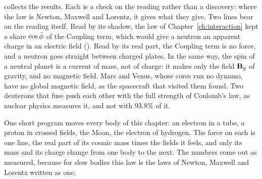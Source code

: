  collects the results. Each is a check on the reading rather than a discovery: where the law is Newton, Maxwell and Lorentz, it gives what they give. Two lines bear on the reading itself. Read by its shadow, the law of Chapter~\ref{ch:interaction} kept a share $\cos\bar{\phi}$ of the Coupling term, which would give a neutron an apparent charge in an electric field (). Read by its real part, the Coupling term is no force, and a neutron goes straight between charged plates. In the same way, the spin of a neutral planet is a current of mass, not of charge: it makes only the field $\mathbf{B}_g$ of gravity, and no magnetic field. Mars and Venus, whose cores run no dynamo, have no global magnetic field, as the spacecraft that visited them found. Two deuterons that fuse push each other with the full strength of Coulomb's law, as nuclear physics measures it, and not with $93.8\%$ of it.

\begin{plainwords}
One short program moves every body of this chapter: an electron in a tube, a proton in crossed fields, the Moon, the electron of hydrogen. The force on each is one line, the real part of its cosmic mass times the fields it feels, and only its mass and its charge change from one body to the next. The numbers come out as measured, because for slow bodies this law is the laws of Newton, Maxwell and Lorentz written as one.
\end{plainwords}
